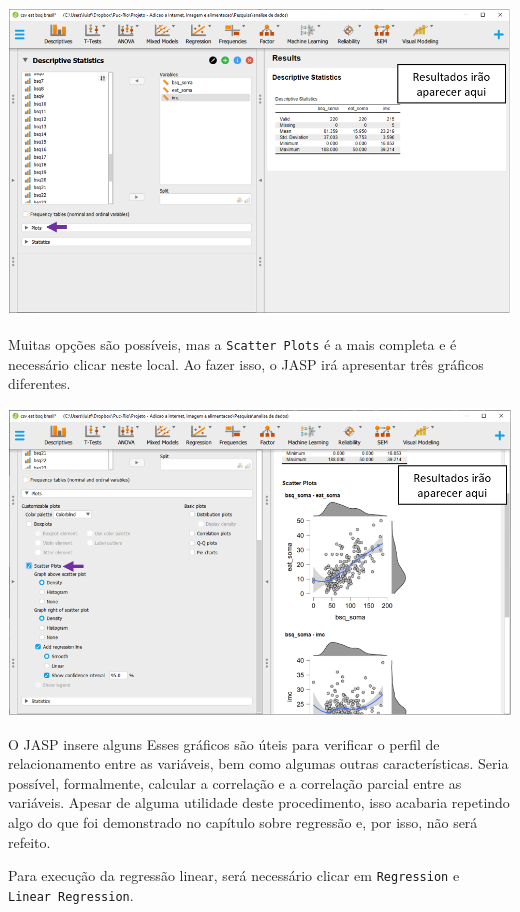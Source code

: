 \documentclass[
]{book}
\begin{document}
\includegraphics{./img/cap_reg_multipla_plots.png}

Muitas opções são possíveis, mas a \texttt{Scatter\ Plots} é a mais completa e é necessário clicar neste local. Ao fazer isso, o JASP irá apresentar três gráficos diferentes.

\includegraphics{./img/cap_reg_multipla_plots2.png}

O JASP insere alguns Esses gráficos são úteis para verificar o perfil de relacionamento entre as variáveis, bem como algumas outras características. Seria possível, formalmente, calcular a correlação e a correlação parcial entre as variáveis. Apesar de alguma utilidade deste procedimento, isso acabaria repetindo algo do que foi demonstrado no capítulo sobre regressão e, por isso, não será refeito.

Para execução da regressão linear, será necessário clicar em \texttt{Regression} e \texttt{Linear\ Regression}.
\end{document}

